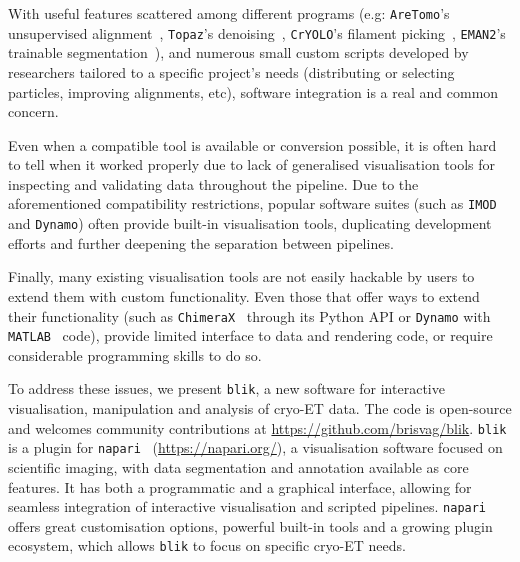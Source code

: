 With useful features scattered among different programs (e.g: \texttt{AreTomo}'s unsupervised alignment~\cite{zhengAreTomoIntegratedSoftware2022}, \texttt{Topaz}'s denoising~\cite{beplerTopazDenoiseGeneralDeep2020}, \texttt{CrYOLO}'s filament picking~\cite{wagnerSPHIREcrYOLOFastAccurate2019}, \texttt{EMAN2}'s trainable segmentation~\cite{galaz-montoyaSingleParticleTomography2015}), and numerous small custom scripts developed by researchers tailored to a specific project's needs (distributing or selecting particles, improving alignments, etc), software integration is a real and common concern.

Even when a compatible tool is available or conversion possible, it is often hard to tell when it worked properly due to lack of generalised visualisation tools for inspecting and validating data throughout the pipeline. Due to the aforementioned compatibility restrictions, popular software suites (such as \texttt{IMOD} and \texttt{Dynamo}) often provide built-in visualisation tools, duplicating development efforts and further deepening the separation between pipelines.

Finally, many existing visualisation tools are not easily hackable by users to extend them with custom functionality. Even those that offer ways to extend their functionality (such as \texttt{ChimeraX}~\cite{pettersenUCSFChimeraXStructure2021} through its Python API or \texttt{Dynamo} with \texttt{MATLAB}~\cite{MATLAB} code), provide limited interface to data and rendering code, or require considerable programming skills to do so.

\vspace{\baselineskip}

To address these issues, we present \texttt{blik}, a new software for interactive visualisation, manipulation and analysis of cryo-ET data. The code is open-source and welcomes community contributions at \url{https://github.com/brisvag/blik}. \texttt{blik} is a plugin for \texttt{napari}~\cite{thenaparicommunityNapariMultidimensionalImage,Ahlers_napari_a_multi-dimensional} (\url{https://napari.org/}), a visualisation software focused on scientific imaging, with data segmentation and annotation available as core features. It has both a programmatic and a graphical interface, allowing for seamless integration of interactive visualisation and scripted pipelines. \texttt{napari} offers great customisation options, powerful built-in tools and a growing plugin ecosystem, which allows \texttt{blik} to focus on specific cryo-ET needs.


